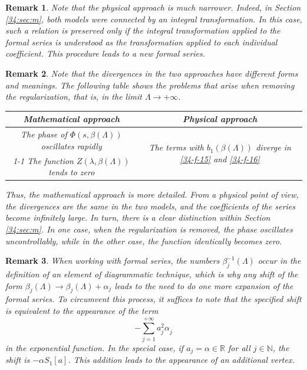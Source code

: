 \documentclass[a4paper]{article}
\newtheorem{remark}{Remark}
\begin{document}
\begin{remark}\label{34-r-8}
Note that the physical approach is much narrower. Indeed, in Section \ref{34:sec:m}, both models were connected by an integral transformation. In this case, such a relation is preserved only if the integral transformation applied to the formal series is understood as the transformation applied to each individual coefficient. This procedure leads to a new formal series.
\end{remark}
\begin{remark}\label{34-r-9}
Note that the divergences in the two approaches have different forms and meanings. The following table shows the problems that arise when removing the regularization, that is, in the limit $\Lambda\to+\infty$.
\begin{center}
\renewcommand{\arraystretch}{2}
\begin{tabular}{|c|c|}
	\hline
	Mathematical approach & Physical approach\\
	\hline
	 The phase of $\Phi(s,\beta(\Lambda))$ oscillates rapidly&\multirow{2}{*}{The terms with $b_1(\beta(\Lambda))$ diverge in \eqref{34-f-15} and \eqref{34-f-16}} \\
	\cline{1-1}
	 The function $Z(\lambda,\beta(\Lambda))$ tends to zero &\\
	\hline
\end{tabular}
\renewcommand{\arraystretch}{1}
\end{center}
Thus, the mathematical approach is more detailed. From a physical point of view, the divergences are the same in the two models, and the coefficients of the series become infinitely large. In turn, there is a clear distinction within Section \ref{34:sec:m}. In one case, when the regularization is removed, the phase oscillates uncontrollably, while in the other case, the function identically becomes zero.
\end{remark}
\begin{remark}\label{34-r-10}
When working with formal series, the numbers $\beta_j^{-1}(\Lambda)$ occur in the definition of an element of diagrammatic technique, which is why any shift of the form $\beta_j(\Lambda)\to\beta_j(\Lambda)+\alpha_j$ leads to the need to do one more expansion of the formal series. To circumvent this process, it suffices to note that the specified shift is equivalent to the appearance of the term 
$$-\sum_{j=1}^{+\infty}a_j^2\alpha_j^{\phantom{1}}$$ 
in the exponential function. In the special case, if $a_j=\alpha\in\mathbb{R}$ for all $j\in\mathbb{N}$, the shift is $-\alpha S_1[a]$. This addition leads to the appearance of an additional vertex.
\end{remark}
\end{document}
